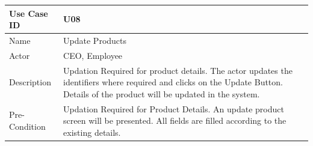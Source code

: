\documentclass[12pt,a4paper]{report}
\begin{document}
\begin{tabular}{ | m{3cm} | m{12cm}| } \hline

Use Case ID &  U08 \\\hline

Name  	    &  Update Products \\ \hline

Actor     	& CEO, Employee \\ \hline

Description &  Updation Required for product details. The actor updates the identifiers where required and clicks on the Update Button. Details of the product will be updated in the system. \\ \hline



Pre-Condition &  Updation Required for Product Details. An update product screen will be presented. All fields are filled according to the existing details. \\ \hline
\end{tabular}
\end{document}
